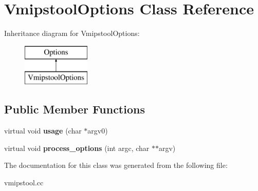 \hypertarget{classVmipstoolOptions}{
\section{VmipstoolOptions Class Reference}
\label{classVmipstoolOptions}
}
Inheritance diagram for VmipstoolOptions:\begin{figure}[H]
\begin{center}
\leavevmode
\includegraphics[height=2cm]{classVmipstoolOptions}
\end{center}
\end{figure}
\subsection*{Public Member Functions}
\begin{DoxyCompactItemize}
\item 
\hypertarget{classVmipstoolOptions_a0b491d0ea280503ddfa10301ead352a9}{
virtual void {\bfseries usage} (char $\ast$argv0)}
\label{classVmipstoolOptions_a0b491d0ea280503ddfa10301ead352a9}

\item 
\hypertarget{classVmipstoolOptions_a97de4ae758e6967ec609d53c828a6b05}{
virtual void {\bfseries process\_\-options} (int argc, char $\ast$$\ast$argv)}
\label{classVmipstoolOptions_a97de4ae758e6967ec609d53c828a6b05}

\end{DoxyCompactItemize}


The documentation for this class was generated from the following file:\begin{DoxyCompactItemize}
\item 
vmipstool.cc\end{DoxyCompactItemize}
